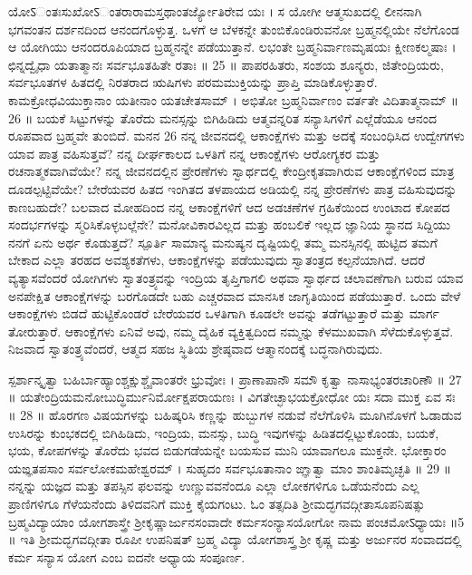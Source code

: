 ಯೋऽಂತಃಸುಖೋऽಂತರಾರಾಮಸ್ತಥಾಂತರ್ಜ್ಯೋತಿರೇವ ಯಃ ।
ಸ ಯೋಗೀ  ಆತ್ಮಸುಖದಲ್ಲಿ ಲೀನನಾಗಿ ಭಗವಂತನ ದರ್ಶನದಿಂದ ಆನಂದಗೊಳ್ಳುತ್ತ. ಒಳಗೆ ಆ ಬೆಳಕನ್ನೇ ತುಂಬಿಕೊಂಡಿರುವನೋ ಬ್ರಹ್ಮನಲ್ಲಿಯೇ ನೆಲೆಗೊಂಡ ಆ ಯೋಗಿಯು ಆನಂದರೂಪಿಯಾದ ಬ್ರಹ್ಮನನ್ನೇ ಪಡೆಯುತ್ತಾನೆ.
ಲಭಂತೇ ಬ್ರಹ್ಮನಿರ್ವಾಣಮೃಷಯಃ ಕ್ಷೀಣಕಲ್ಮಷಾಃ ।
ಛಿನ್ನದ್ವೈಧಾ ಯತಾತ್ಮಾನಃ ಸರ್ವಭೂತಹಿತೇ ರತಾಃ ॥ 25 ॥
 ಪಾಪರಹಿತರು, ಸಂಶಯ ಶೂನ್ಯರು, ಜಿತೇಂದ್ರಿಯರು, ಸರ್ವಭೂತಗಳ ಹಿತದಲ್ಲಿ ನಿರತರಾದ ಋಷಿಗಳು ಪರಮಮುಕ್ತಿಯನ್ನು ಪ್ರಾಪ್ತಿ ಮಾಡಿಕೊಳ್ಳುತ್ತಾರೆ.
ಕಾಮಕ್ರೋಧವಿಯುಕ್ತಾನಾಂ ಯತೀನಾಂ ಯತಚೇತಸಾಮ್ ।
ಅಭಿತೋ ಬ್ರಹ್ಮನಿರ್ವಾಣಂ ವರ್ತತೇ ವಿದಿತಾತ್ಮನಾಮ್ ॥ 26 ॥
 ಬಯಕೆ ಸಿಟ್ಟುಗಳನ್ನು ತೊರೆದು ಮನಸ್ಸನ್ನು ಬಿಗಿಹಿಡಿದು ಆತ್ಮವನ್ನರಿತ ಸನ್ಯಾಸಿಗಳಿಗೆ ಎಲ್ಲೆಡೆಯೂ ಆನಂದ ರೂಪವಾದ ಬ್ರಹ್ಮವೇ ತುಂಬಿದೆ.
ಮನನ 26
 ನನ್ನ ಜೀವನದಲ್ಲಿ ಆಕಾಂಕ್ಷೆಗಳು ಮತ್ತು ಅದಕ್ಕೆ ಸಂಬಂಧಿಸಿದ ಉದ್ವೇಗಗಳು ಯಾವ ಪಾತ್ರ ವಹಿಸುತ್ತವೆ? ನನ್ನ ದೀರ್ಘಕಾಲದ ಒಳತಿಗೆ ನನ್ನ ಆಕಾಂಕ್ಷೆಗಳು ಆರೋಗ್ಯಕರ ಮತ್ತು ರಚನಾತ್ಮಕವಾಗಿವೆಯೇ? ನನ್ನ ಜೀವನದಲ್ಲಿನ ಪ್ರೇರಣೆಗಳು ಸ್ವಾರ್ಥದಲ್ಲಿ ಕೇಂದ್ರೀಕೃತವಾಗಿರುವ ಆಕಾಂಕ್ಷೆಗಳಿಂದ ಮಾತ್ರ ದೂಡಲ್ಪಟ್ಟಿವೆಯೇ? ಬೇರೆಯವರ ಹಿತದ ಇಂಗಿತದ ತಳಪಾಯದ ಅಡಿಯಲ್ಲಿ ನನ್ನ ಪ್ರೇರಣೆಗಳು ಪಾತ್ರ ವಹಿಸುವುದನ್ನು ಕಾಣಬಹುದೇ? ಬಲವಾದ ಮೋಹದಿಂದ ನನ್ನ ಆಕಾಂಕ್ಷೆಗಳಿಗೆ ಆದ ಅಡಚಣೆಗಳ ಗ್ರಹಿಕೆಯಿಂದ ಉಂಟಾದ ಕೋಪದ ಸಂದರ್ಭಗಳನ್ನು ಸ್ಮರಿಸಿಕೊಳ್ಳಬಲ್ಲೆನೇ? ಮನೋವಿಕಾರವಿಲ್ಲದ ಮತ್ತು ಹಂಬಲಿಕೆ ಇಲ್ಲದ ಜ್ಞಾನಿಯ ಸ್ಥಾನದ ಸಿದ್ದಿಯು ನನಗೆ ಏನು ಅರ್ಥ ಕೊಡುತ್ತದೆ?
 ಸ್ಪೂರ್ತಿ 
 ಸಾಮಾನ್ಯ ಮನುಷ್ಯನ ದೃಷ್ಟಿಯಲ್ಲಿ ತಮ್ಮ ಮನಸ್ಸಿನಲ್ಲಿ ಹುಟ್ಟಿದ ತಮಗೆ ಬೇಕಾದ ಎಲ್ಲಾ ತರಹದ ಅವಶ್ಯಕತೆಗಳು, ಆಕಾಂಕ್ಷೆಗಳನ್ನು ಪಡೆಯುವುದು ಸ್ವಾತಂತ್ರದ ಕಲ್ಪನೆಯಾಗಿದೆ. ಆದರೆ ವ್ಯತ್ಯಾಸವೆಂದರೆ ಯೋಗಿಗಳು ಸ್ವಾತಂತ್ರ್ಯವನ್ನು ಇಂದ್ರಿಯ ತೃಪ್ತಿಗಾಗಲಿ ಅಥವಾ ಸ್ವಾರ್ಥದ ಚಲಾವಣೆಗಾಗಿ ಬರುವ ಯಾವ ಅನಪೇಕ್ಷಿತ ಆಕಾಂಕ್ಷೆಗಳನ್ನು ಬರಗೊಡದೇ ಬಹು ಎಚ್ಚರವಾದ ಮಾನಸಿಕ ಜಾಗೃತಿಯಿಂದ ಪಡೆಯುತ್ತಾರೆ. ಒಂದು ವೇಳೆ ಆಕಾಂಕ್ಷೆಗಳು ಬಿಡದೆ ಹುಟ್ಟಿಕೊಂಡರೆ ಬೇರೆಯವರ ಒಳತಿಗಾಗಿ ಕೂಡಲೇ ಅವನ್ನು ತಡೆಗಟ್ಟುತ್ತಾರೆ ಮತ್ತು ಮಾರ್ಗ ತೋರುತ್ತಾರೆ. ಆಕಾಂಕ್ಷೆಗಳು ಏನಿವೆ ಅವು, ನಮ್ಮ ದೈಹಿಕ ವ್ಯಕ್ತಿತ್ವದಿಂದ ನಮ್ಮನ್ನು ಕೆಳಮುಖವಾಗಿ ಸೆಳೆದುಕೊಳ್ಳುತ್ತವೆ. ನಿಜವಾದ ಸ್ವಾತಂತ್ರ್ಯವೆಂದರೆ, ಆತ್ಮದ ಸಹಜ ಸ್ಥಿತಿಯ  ಶ್ರೇಷ್ಠವಾದ  ಆತ್ಮಾನಂದಕ್ಕೆ   ಬದ್ಧನಾಗಿರುವುದು.

ಸ್ಪರ್ಶಾನ್ಕೃತ್ವಾ ಬಹಿರ್ಬಾಹ್ಯಾಂಶ್ಚಕ್ಷುಶ್ಚೈವಾಂತರೇ ಭ್ರುವೋಃ ।
ಪ್ರಾಣಾಪಾನೌ ಸಮೌ ಕೃತ್ವಾ ನಾಸಾಭ್ಯಂತರಚಾರಿಣೌ ॥ 27 ॥
ಯತೇಂದ್ರಿಯಮನೋಬುದ್ಧಿರ್ಮುನಿರ್ಮೋಕ್ಷಪರಾಯಣಃ ।
ವಿಗತೇಚ್ಛಾಭಯಕ್ರೋಧೋ ಯಃ ಸದಾ ಮುಕ್ತ ಏವ ಸಃ ॥ 28 ॥
 ಹೊರಗಣ ವಿಷಯಗಳನ್ನು ಬಹಿಷ್ಕರಿಸಿ ಕಣ್ಣನ್ನು ಹುಬ್ಬುಗಳ ನಡುವೆ ನೆಲೆಗೊಳಿಸಿ ಮೂಗಿನೊಳಗೆ ಓಡಾಡುವ ಉಸಿರನ್ನು ಕುಂಭಕದಲ್ಲಿ ಬಿಗಿಹಿಡಿದು, ಇಂದ್ರಿಯ, ಮನಸ್ಸು, ಬುದ್ಧಿ ಇವುಗಳನ್ನು ಹಿಡಿತದಲ್ಲಿಟ್ಟುಕೊಂಡು, ಬಯಕೆ, ಭಯ, ಕೋಪಗಳನ್ನು ತೊರೆದು ಭವದ ಬಿಡುಗಡೆಯನ್ನೇ ಬಯಸುವ ಮುನಿ ಯಾವಾಗಲೂ ಮುಕ್ತನೇ.
ಭೋಕ್ತಾರಂ ಯಙ್ಞತಪಸಾಂ ಸರ್ವಲೋಕಮಹೇಶ್ವರಮ್ ।
ಸುಹೃದಂ ಸರ್ವಭೂತಾನಾಂ ಙ್ಞಾತ್ವಾ ಮಾಂ ಶಾಂತಿಮೃಚ್ಛತಿ ॥ 29 ॥
 ನನ್ನನ್ನು ಯಜ್ಞದ ಮತ್ತು ತಪಸ್ಸಿನ ಫಲವನ್ನು ಉಣ್ಣುವವನೆಂದೂ ಎಲ್ಲಾ ಲೋಕಗಳಿಗೂ ಒಡೆಯನೆಂದು ಎಲ್ಲ ಪ್ರಾಣಿಗಳಿಗೂ ಗೆಳೆಯನೆಂದು ತಿಳಿದವನಿಗೆ ಮುಕ್ತಿ ಕೈಯಗಂಟು.
ಓಂ ತತ್ಸದಿತಿ ಶ್ರೀಮದ್ಭಗವದ್ಗೀತಾಸೂಪನಿಷತ್ಸು ಬ್ರಹ್ಮವಿದ್ಯಾಯಾಂ ಯೋಗಶಾಸ್ತ್ರೇ ಶ್ರೀಕೃಷ್ಣಾರ್ಜುನಸಂವಾದೇ
ಕರ್ಮಸಂನ್ಯಾಸಯೋಗೋ ನಾಮ ಪಂಚಮೋऽಧ್ಯಾಯಃ ॥5 ॥
 ಇತಿ ಶ್ರೀಮದ್ಭಗವದ್ಗೀತಾ ರೂಪೀ ಉಪನಿಷತ್ ಬ್ರಹ್ಮ ವಿದ್ಯಾ ಯೋಗಶಾಸ್ತ್ರ ಶ್ರೀ ಕೃಷ್ಣ ಮತ್ತು ಅರ್ಜುನರ ಸಂವಾದದಲ್ಲಿ   ಕರ್ಮ ಸನ್ಯಾಸ ಯೋಗ ಎಂಬ ಐದನೇ ಅಧ್ಯಾಯ ಸಂಪೂರ್ಣ.


